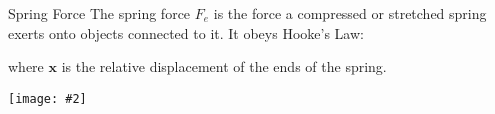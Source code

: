 \documentclass[12pt,compress,aspectratio=169]{beamer}
\newcommand{\pic}[2]{\texttt{[image: \#2]}}
\newcommand{\eq}[2]{\vspace{#1}{\Large\begin{displaymath}#2\end{displaymath}}}
\begin{document}
\begin{frame}{Spring Force}
  The spring force $F_e$ is the force a compressed or stretched spring
  exerts onto objects connected to it. It obeys Hooke's Law:
  
  \eq{-.2in}{
    \bm{F}_e=-k\bm{x}
  }
  where $\bm{x}$ is the relative displacement of the ends of the spring.
  \begin{center}
    \pic{.35}{graphics/spring-example1}
  \end{center}
\end{frame}


%
%
%
\end{document}
